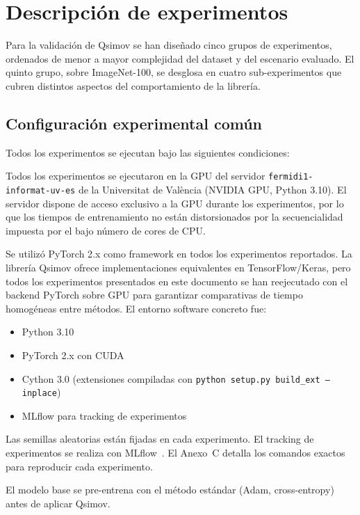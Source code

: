 
\section{Descripción de experimentos}

Para la validación de Qsimov se han diseñado cinco grupos de experimentos, ordenados de menor a
mayor complejidad del dataset y del escenario evaluado. El quinto grupo, sobre ImageNet-100, se
desglosa en cuatro sub-experimentos que cubren distintos aspectos del comportamiento de la librería.

\subsection{Configuración experimental común}

Todos los experimentos se ejecutan bajo las siguientes condiciones:

Todos los experimentos se ejecutaron en la GPU del servidor
\texttt{fermidi1-informat-uv-es} de la Universitat de València (NVIDIA GPU, Python 3.10). El
servidor dispone de acceso exclusivo a la GPU durante los experimentos, por lo que los tiempos de
entrenamiento no están distorsionados por la secuencialidad impuesta por el bajo número de cores de
CPU.

Se utilizó PyTorch 2.x como framework en todos los experimentos reportados. La librería Qsimov
ofrece implementaciones equivalentes en TensorFlow/Keras, pero todos los experimentos presentados en
este documento se han reejecutado con el backend PyTorch sobre GPU para garantizar comparativas de
tiempo homogéneas entre métodos. El entorno software concreto fue:
\begin{itemize}
  \item Python 3.10
  \item PyTorch 2.x con CUDA
  \item Cython 3.0 (extensiones compiladas con \texttt{python setup.py build\_ext --inplace})
  \item MLflow para tracking de experimentos
\end{itemize}

Las semillas aleatorias están fijadas en cada experimento. El tracking de experimentos se realiza
con MLflow~\cite{ref16}. El Anexo~C detalla los comandos exactos para reproducir cada experimento.

El modelo base se pre-entrena con el método estándar (Adam, cross-entropy) antes de aplicar Qsimov.

